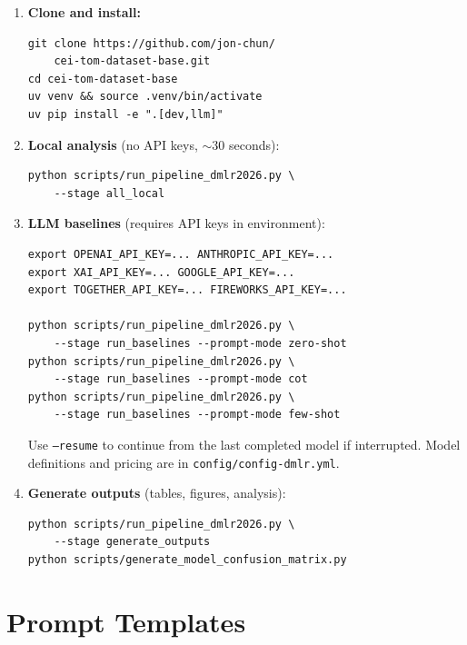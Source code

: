 \documentclass[twoside,11pt]{article}
\begin{document}
\begin{enumerate}[leftmargin=*,noitemsep]
    \item \textbf{Clone and install:}
\begin{small}
\begin{verbatim}
git clone https://github.com/jon-chun/
    cei-tom-dataset-base.git
cd cei-tom-dataset-base
uv venv && source .venv/bin/activate
uv pip install -e ".[dev,llm]"
\end{verbatim}
\end{small}
    \item \textbf{Local analysis} (no API keys, $\sim$30 seconds):
\begin{small}
\begin{verbatim}
python scripts/run_pipeline_dmlr2026.py \
    --stage all_local
\end{verbatim}
\end{small}
    \item \textbf{LLM baselines} (requires API keys in environment):
\begin{small}
\begin{verbatim}
export OPENAI_API_KEY=... ANTHROPIC_API_KEY=...
export XAI_API_KEY=... GOOGLE_API_KEY=...
export TOGETHER_API_KEY=... FIREWORKS_API_KEY=...

python scripts/run_pipeline_dmlr2026.py \
    --stage run_baselines --prompt-mode zero-shot
python scripts/run_pipeline_dmlr2026.py \
    --stage run_baselines --prompt-mode cot
python scripts/run_pipeline_dmlr2026.py \
    --stage run_baselines --prompt-mode few-shot
\end{verbatim}
\end{small}
    Use \texttt{--resume} to continue from the last completed model if interrupted. Model definitions and pricing are in \texttt{config/config-dmlr.yml}.
    \item \textbf{Generate outputs} (tables, figures, analysis):
\begin{small}
\begin{verbatim}
python scripts/run_pipeline_dmlr2026.py \
    --stage generate_outputs
python scripts/generate_model_confusion_matrix.py
\end{verbatim}
\end{small}
\end{enumerate}

\section{Prompt Templates}
\label{app:prompts}
\end{document}
